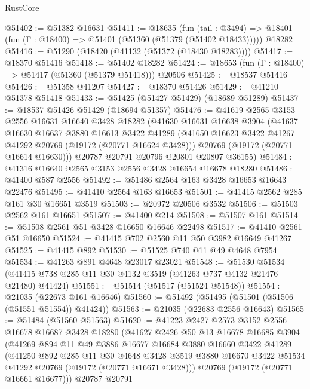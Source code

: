 \begin{lexlean}{RustCore}
\begin{coremodule}
@51402 := @51382 @16631
@51411 := @18635
    (fun (tail : @3494) => @18401 (fun (Γ : @18400) => @51401 (@51360 (@51379 (@51402 @18433)))))
    @18282
@51416 := @51290 (@18420 (@41132 (@51372 (@18430 @18283))))
@51417 := @18370 @51416
@51418 := @51402 @18282
@51424 := @18653 (fun (Γ : @18400) => @51417 (@51360 (@51379 @51418))) @20506
@51425 := @18537 @51416
@51426 := @51358 @41207
@51427 := @18370 @51426
@51429 := @41210 @51378 @51418
@51433 := @51425 (@51427 @51429) (@18689 @51289)
@51437 := @18537 @51426 @51429 (@18694 @51357)
@51476 := @41619
    @2565
    @3153
    @2556
    @16631
    @16640
    @3428
    @18282
    (@41630
      @16631
      @16638
      @3904
      (@41637
        @16630
        @16637
        @3880
        @16613
        @3422
        @41289
        (@41650 @16623 @3422 @41267 @41292 @20769 (@19172 (@20771 @16624 @3428)))
        @20769
        (@19172 (@20771 @16614 @16630)))
      @20787
      @20791
      @20796
      @20801
      @20807
      @36155)
@51484 := @41316 @16640 @2565 @3153 @2556 @3428 @16654 @16678 @18280
@51486 := @41400 @587 @2556
@51492 := @51486 @2564 @163 @3428 @16653 @16643 @22476
@51495 := @41410 @2564 @163 @16653
@51501 := @41415 @2562 @285 @161 @30 @16651 @3519
@51503 := @20972 @20506 @3532
@51506 := @51503 @2562 @161 @16651
@51507 := @41400 @214
@51508 := @51507 @161
@51514 := @51508 @2561 @51 @3428 @16650 @16646 @22498
@51517 := @41410 @2561 @51 @16650
@51524 := @41415 @702 @2560 @11 @50 @3982 @16649 @41267
@51525 := @41415 @892
@51530 := @51525 @740 @11 @49 @4648 @7954
@51534 := @41263 @891 @4648 @23017 @23021
@51548 := @51530
    @51534
    (@41415 @738 @285 @11 @30 @4132 @3519 (@41263 @737 @4132 @21476 @21480) @41424)
@51551 := @51514 (@51517 (@51524 @51548))
@51554 := @21035 (@22673 @161 @16646)
@51560 := @51492 (@51495 (@51501 (@51506 (@51551 @51554)) @41424))
@51563 := @21035 (@22683 @2556 @16643)
@51565 := @51484 (@51560 @51563)
@51620 := @41223
    @2427
    @2573
    @3152
    @2556
    @16678
    @16687
    @3428
    @18280
    (@41627
      @2426
      @50
      @13
      @16678
      @16685
      @3904
      (@41269
        @894
        @11
        @49
        @3886
        @16677
        @16684
        @3880
        @16660
        @3422
        @41289
        (@41250
          @892
          @285
          @11
          @30
          @4648
          @3428
          @3519
          @3880
          @16670
          @3422
          @51534
          @41292
          @20769
          (@19172 (@20771 @16671 @3428)))
        @20769
        (@19172 (@20771 @16661 @16677)))
      @20787
      @20791

\end{coremodule}
\end{lexlean}
